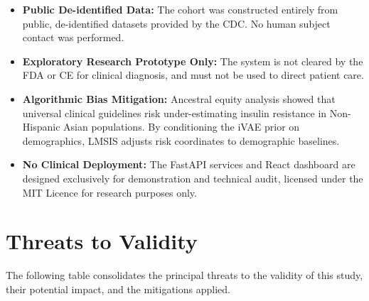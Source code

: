 \documentclass[12pt,a4paper,oneside]{report}
\begin{document}
\begin{itemize}[leftmargin=*]
    \item \textbf{Public De-identified Data:} The cohort was constructed entirely from public, de-identified datasets provided by the CDC. No human subject contact was performed.
    \item \textbf{Exploratory Research Prototype Only:} The system is not cleared by the FDA or CE for clinical diagnosis, and must not be used to direct patient care.
    \item \textbf{Algorithmic Bias Mitigation:} Ancestral equity analysis showed that universal clinical guidelines risk under-estimating insulin resistance in Non-Hispanic Asian populations. By conditioning the iVAE prior on demographics, LMSIS adjusts risk coordinates to demographic baselines.
    \item \textbf{No Clinical Deployment:} The FastAPI services and React dashboard are designed exclusively for demonstration and technical audit, licensed under the MIT Licence for research purposes only.
\end{itemize}

\section*{Threats to Validity}

The following table consolidates the principal threats to the validity of this study, their potential impact, and the mitigations applied.
\end{document}
